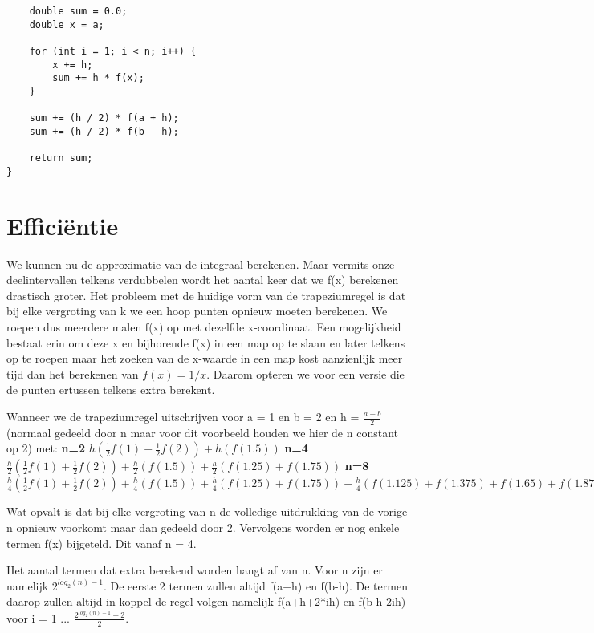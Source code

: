 \documentclass{article}
\begin{document}
\begin{flushleft}
\begin{verbatim}
    double sum = 0.0;
    double x = a;

    for (int i = 1; i < n; i++) {
        x += h;
        sum += h * f(x);
    }

    sum += (h / 2) * f(a + h);
    sum += (h / 2) * f(b - h);

    return sum;
}
\end{verbatim}

\section{Efficiëntie}
We kunnen nu de approximatie van de integraal berekenen. Maar vermits onze deelintervallen telkens verdubbelen wordt het aantal keer dat we f(x) berekenen drastisch groter. Het probleem met de huidige vorm van de trapeziumregel is dat bij elke vergroting van k we een hoop punten opnieuw moeten berekenen. We roepen dus meerdere malen f(x) op met dezelfde x-coordinaat. Een mogelijkheid bestaat erin om deze x en bijhorende f(x) in een map op te slaan en later telkens op te roepen maar het zoeken van de x-waarde in een map kost aanzienlijk meer tijd dan het berekenen van $f(x) = 1/x$. Daarom opteren we voor een versie die de punten ertussen telkens extra berekent.
\newline

Wanneer we de trapeziumregel uitschrijven voor a = 1 en b = 2 en h = $\frac{a-b}{2}$(normaal gedeeld door n maar voor dit voorbeeld houden we hier de n constant op 2) met:
\newline
\textbf{n=2} 
\newline
$h(\frac{1}{2}f(1)+\frac{1}{2}f(2)) + h(f(1.5))$
\newline
\textbf{n=4} 
\newline
$\frac{h}{2}(\frac{1}{2}f(1)+\frac{1}{2}f(2)) + \frac{h}{2}(f(1.5)) + \frac{h}{2}(f(1.25) + f(1.75))$
\newline
\textbf{n=8} 
\newline
$\frac{h}{4}(\frac{1}{2}f(1)+\frac{1}{2}f(2)) + \frac{h}{4}(f(1.5)) + \frac{h}{4}(f(1.25) + f(1.75)) + \frac{h}{4}(f(1.125) + f(1.375)+f(1.65) + f(1.875))$
\newline

Wat opvalt is dat bij elke vergroting van n de volledige uitdrukking van de vorige n opnieuw voorkomt maar dan gedeeld door 2. Vervolgens worden er nog enkele termen f(x) bijgeteld. Dit vanaf n = 4.
\newline

Het aantal termen dat extra berekend worden hangt af van n. Voor n zijn er namelijk $ 2^{log_{2}(n)-1}$. De eerste 2 termen zullen altijd f(a+h) en f(b-h). De termen daarop zullen altijd in koppel de regel volgen namelijk f(a+h+2*ih) en f(b-h-2ih) voor i = 1 ... $  \frac{2^{log_{2}(n)-1}-2}{2}$.
\newline


\end{flushleft}
\end{document}
